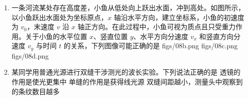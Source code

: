\documentclass[\gkver]{gaokaozhenti}
\begin{document}
\begin{enumerate}
{根据电流的定义式得 $I = \frac{q}{t} = nevb$

当电子稳定通过样品时，其所受电场力与洛伦兹力平衡，则有
$evB = e\frac{U}{b}$

联立解得 $U = \frac{I}{ne}B$

结合图像可得 $k = \frac{I}{ne} = \frac{88\times10^{-3}}{320\times10^{-3}} \UV/\UT$

解得 $n = 2.3 \times 10^{16}$

故选 D。
}

\item
一条河流某处存在高度差，小鱼从低处向上跃出水面，冲到高处。如图所示，以小鱼跃出水面处为坐标原点，$x$ 轴沿水平方向，建立坐标系，小鱼的初速度为 $v_{0}$，末速度 $v$ 沿 $x$ 轴正方向。在此过程中，小鱼可视为质点且只受重力作用。关于小鱼的水平位置 $x$、竖直位置 $y$、水平方向分速度 $v_{x}$ 和竖直方向分速度 $v_{y}$ 与时间 $t$ 的关系，下列图像可能正确的是
{figs/08b.png}
{figs/08c.png}
{figs/08d.png}

\item
某同学用普通光源进行双缝干涉测光的波长实验。下列说法正确的是
{透镜的作用是使光更集中}
{单缝的作用是获得线光源}
{双缝间距越小，测量头中观察到的条纹数目越多}
\end{enumerate}
\end{document}
